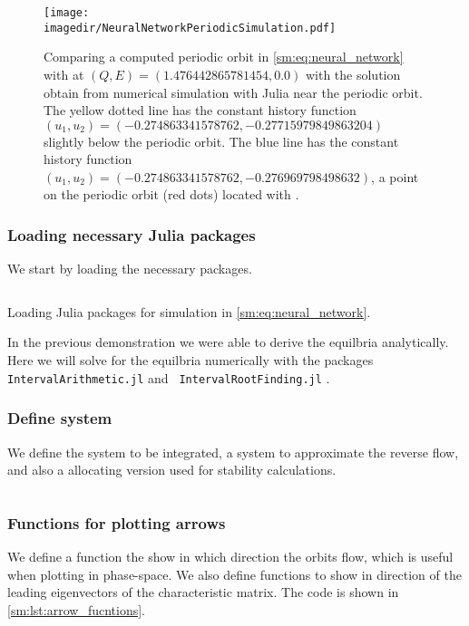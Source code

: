 \begin{figure}[ht]
    \centering
    \texttt{[image: \\imagedir/NeuralNetworkPeriodicSimulation.pdf]}
    \caption{Comparing a computed periodic orbit in \cref{sm:eq:neural_network}
        with \DDEBIFTOOL at $(Q,E)=(1.476442865781454, 0.0)$ with the solution
        obtain from numerical simulation with Julia near the periodic orbit.
        The yellow dotted line has the constant history function $(u_1,u_2) =
        (-0.274863341578762, -0.27715979849863204)$ slightly below the periodic
        orbit.  The blue line has the constant history function $(u_1,u_2) =
        (-0.274863341578762, -0.276969798498632)$, a point on the periodic
        orbit (red dots) located with \DDEBIFTOOL.
    }
    \label{sm:fig:NeuralNetworkPeriodicSimulation}
\end{figure}

\subsubsection{Loading necessary Julia packages}
We start by loading the necessary packages.
\begin{listing}[H]
\inputminted[firstline=1, lastline=6]{julia}{\pathToJuliaFiles/neural_network_model_simulation_article.jl}
\caption{Loading Julia packages for simulation in \cref{sm:eq:neural_network}.}
\label{sm:lst:neuralNetworkLoadingPacakges}
\end{listing}
%
In the previous demonstration we were able to derive the equilbria
analytically.  Here we will solve for the equilbria numerically with the
packages {\tt IntervalArithmetic.jl} \cite{IntervalArithmetic} and  {\tt
IntervalRootFinding.jl} \cite{IntervalRootFinding}.

\subsubsection{Define system}
We define the system to be integrated, a system to approximate the reverse
flow, and also a allocating version used for stability calculations.
\inputminted[firstline=8, lastline=27]{julia}{\pathToJuliaFiles/neural_network_model_simulation_article.jl}

\subsubsection{Functions for plotting arrows}
We define a function the show in which direction the orbits flow, which is
useful when plotting in phase-space. We also define functions to show in
direction of the leading eigenvectors of the characteristic matrix.
The code is shown in \cref{sm:lst:arrow_fucntions}.


